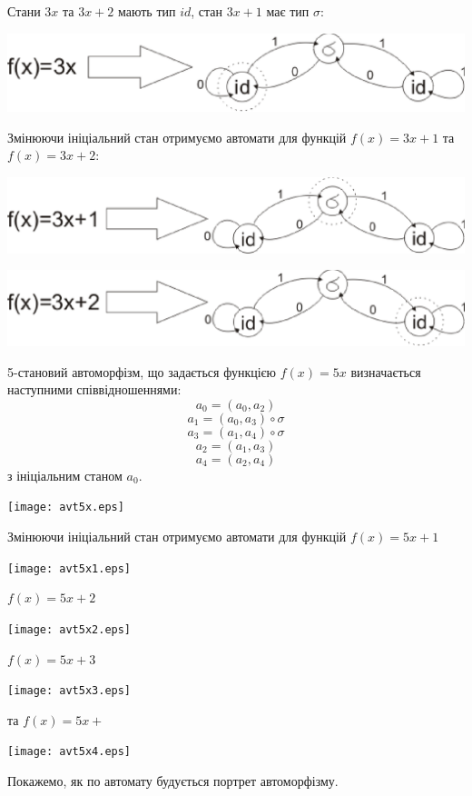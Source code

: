 \documentclass[a4paper,12pt]{article} \usepackage{a4wide}
\numberwithin{equation}{subsection}
\begin{document}
 Стани $3x$ та $3x+2$ мають тип $id$, стан $3x+1$ має тип $\sigma$:

\begin{center}
\includegraphics[scale=0.8]{3x.eps}
\end{center}

 Змінюючи ініціальний стан отримуємо автомати для функцій $f(x)=3x+1$ та $f(x)=3x+2$:


 \begin{center}
\includegraphics[scale=0.8]{3x+1.eps}
\end{center}
\begin{center}
\includegraphics[scale=0.8]{3x+2.eps}
\end{center}
5-становий автоморфізм, що задається функцією $f(x)=5x$ визначається наступними співвідношеннями:
 $$a_0=(a_0,a_2)$$
 $$a_1=(a_0,a_3)\circ\sigma$$
$$a_3=(a_1,a_4)\circ\sigma$$
$$a_2=(a_1,a_3)$$
$$a_4=(a_2,a_4)$$
з ініціальним станом $a_0$.
\begin{center}
\texttt{[image: avt5x.eps]}
\end{center}
Змінюючи ініціальний стан отримуємо автомати для функцій $f(x)=5x+1$
\begin{center}
\texttt{[image: avt5x1.eps]}
\end{center}
$f(x)=5x+2$
\begin{center}
\texttt{[image: avt5x2.eps]}
\end{center}
$f(x)=5x+3$
\begin{center}
\texttt{[image: avt5x3.eps]}
\end{center}
та $f(x)=5x+$
\begin{center}
\texttt{[image: avt5x4.eps]}
\end{center}
 Покажемо, як по автомату будується портрет автоморфізму.
\end{document}
